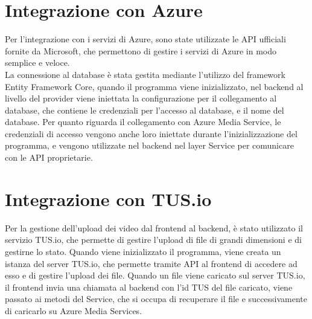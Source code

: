 \section{Integrazione con Azure}
Per l'integrazione con i servizi di Azure, sono state utilizzate le API ufficiali fornite da Microsoft, che permettono di gestire i servizi di Azure in modo semplice e veloce.\\
La connessione al database è stata gestita mediante l'utilizzo del framework Entity Framework Core, quando il programma viene inizializzato, nel backend al livello del provider viene iniettata la configurazione per il collegamento al database, che contiene le credenziali per l'accesso al database, e il nome del database. Per quanto riguarda il collegamento con Azure Media Service, le credenziali di accesso vengono anche loro iniettate durante l'inizializzazione del programma, e vengono utilizzate nel backend nel layer Service per comunicare con le API proprietarie.

\section{Integrazione con TUS.io}
Per la gestione dell'upload dei video dal frontend al backend, è stato utilizzato il servizio TUS.io, che permette di gestire l'upload di file di grandi dimensioni e di gestirne lo stato. Quando viene inizializzato il programma, viene creata un istanza del server TUS.io, che permette tramite API al frontend di accedere ad esso e di gestire l'upload dei file. Quando un file viene caricato sul server TUS.io, il frontend invia una chiamata al backend con l'id TUS del file caricato, viene passato ai metodi del Service, che si occupa di recuperare il file e successivamente di caricarlo su Azure Media Services.\\
